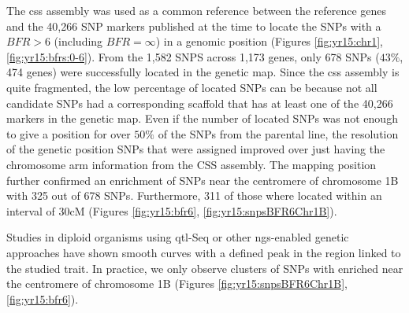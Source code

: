 The \acrshort{css} assembly was used as a common reference between the reference genes and the 40,266 SNP markers published at the time \citep{Wang2014} to locate the SNPs with a $BFR>6$ (including $BFR=\infty$) in a genomic position (Figures \ref{fig:yr15:chr1}, \ref{fig:yr15:bfrs:0-6}).  
From the 1,582 SNPS across 1,173 genes,  only 678 SNPs ($43\%$, 474 genes) were successfully located in the genetic map. 
Since the \acrshort{css} assembly is quite fragmented, the low percentage of located SNPs can be because not all candidate SNPs had a corresponding scaffold that has at least one of the 40,266 markers in the genetic map. 
Even if the number of located SNPs was not enough to give a position for over $50\%$ of the SNPs from the parental line, the resolution of the genetic position SNPs that were assigned improved over just having the chromosome arm information from the CSS assembly. 
The mapping position further confirmed an enrichment of SNPs near the centromere of chromosome 1B with 325 out of 678 SNPs. 
Furthermore, 311 of those where located within an interval of 30cM (Figures \ref{fig:yr15:bfr6}, \ref{fig:yr15:snpsBFR6Chr1B}). 

Studies in diploid organisms using \acrshort{qtl}-Seq \citep{Takagi2013} or other \acrshort{ngs}-enabled genetic approaches \citep{James2013} have shown smooth curves with a defined peak in the region linked to the studied trait. 
In practice, we only observe clusters of SNPs with  enriched  near the centromere of chromosome 1B (Figures \ref{fig:yr15:snpsBFR6Chr1B}, \ref{fig:yr15:bfr6}). 

